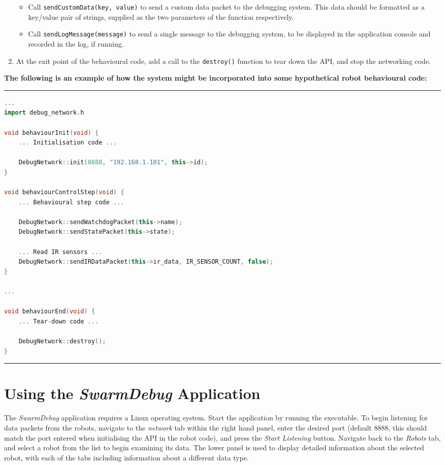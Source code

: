 \begin{enumerate}
\begin{itemize}
  \item Call \texttt{sendCustomData(key, value)} to send a custom data packet to the debugging system. This data should be formatted as a key/value pair of strings, supplied as the two parameters of the function respectively.
  \item Call \texttt{sendLogMessage(message)} to send a single message to the debugging system, to be displayed in the application console and recorded in the log, if running.
 \end{itemize}
 \item At the exit point of the behavioural code, add a call to the \texttt{destroy()} function to tear down the API, and stop the networking code.
\end{enumerate}

\noindent \textbf{The following is an example of how the system might be incorporated into some hypothetical robot behavioural code:}

\noindent \rule{\textwidth}{0.4pt}
\begin{lstlisting}[language=c++, basicstyle=\small]
...
import debug_network.h

void behaviourInit(void) {
    ... Initialisation code ...
    
    DebugNetwork::init(8888, "192.168.1.101", this->id);
}

void behaviourControlStep(void) {
	... Behavioural step code ...
	
	DebugNetwork::sendWatchdogPacket(this->name);
	DebugNetwork::sendStatePacket(this->state);
	
	... Read IR sensors ... 
	DebugNetwork::sendIRDataPacket(this->ir_data, IR_SENSOR_COUNT, false);
}

...

void behaviourEnd(void) {
	... Tear-down code ...
	
	DebugNetwork::destroy();
}
\end{lstlisting}
\rule{\textwidth}{0.4pt}

\section{Using the \textit{SwarmDebug} Application}

The \textit{SwarmDebug} application requires a Linux operating system. Start the application by running the executable. To begin listening for data packets from the robots, navigate to the \textit{network} tab within the right hand panel, enter the desired port (default 8888, this should match the port entered when initialising the API in the robot code), and press the \textit{Start Listening} button. Navigate back to the \textit{Robots} tab, and select a robot from the list to begin examining its data. The lower panel is used to display detailed information about the selected robot, with each of the tabs including information about a different data type.

